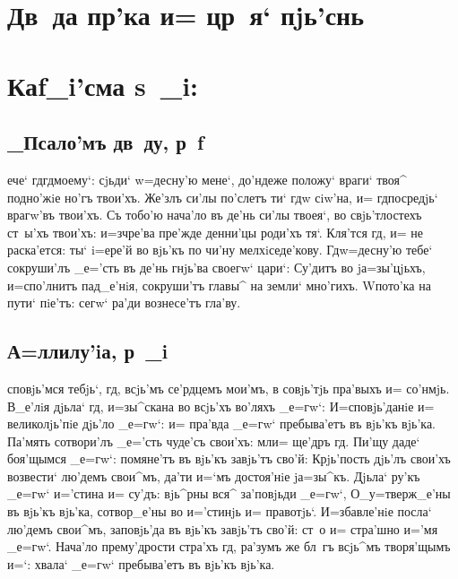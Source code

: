 \documentclass[12pt,a6paper,twoside,dvips,civil=antiqua,cs=pochaev]{hipbook}
\begin{document}
\csendpict

\clearpage
\hdrcrosspage

\section{{\Large Дв~да пр'ка и= цр~я` пjь'снь}}
\section[Каf_i'сма s~_i]{Каf_i'сма s~_i:}

\subsection{_Псало'мъ дв~ду, р~f}

ече` гд гд моему`: сjьди` w=десну'ю мене`, до'ндеже  по\-ло\-жу`
враги` твоя^ подно'жiе но'гъ твои'хъ. Же'злъ си'лы по'\-слетъ ти` гд w\т
сiw'на, и= гд посредjь` врагw'въ тво\-и'хъ. Съ тобо'ю нача'ло въ де'нь
си'лы твоея`, во свjь'тлостехъ ст~ы'хъ твои'хъ: и=з\ъ чре'ва пре'\-жде денни'цы
роди'хъ тя`. Кля'т\-ся гд, и= не раска'ется: ты` i=ере'й во вjь'къ по чи'ну
мел\-хi\-се\-де'\-ко\-ву. Гд w=десну'ю тебе` сокруши'лъ _е='сть въ де'нь гнjь'\-ва
своегw` цари`: Су'дитъ во jа=зы'цjьхъ, и=спо'лнитъ па\-д_е'\-нiя, сокруши'тъ
главы^ на земли` мно'гихъ. W\т пото'ка на пути` пiе'тъ: сегw` ра'ди вознесе'тъ
гла'ву.

\delimpict

\subsection{А=ллилу'iа, р~_i}

сповjь'мся тебjь`, гд, всjь'мъ се'рдцемъ мои'мъ, в совjь'тjь
пра'выхъ и= со'нмjь. В_е'лiя дjьла` гд, и=зы^скана во всjь'хъ во'ляхъ
_е=гw`: И=сповjь'данiе и= великолjь'пiе дjь'ло _е=гw`: и= пра'вда _е=гw`
пребыва'етъ въ вjь'къ вjь'ка. Па'мять сотвори'лъ _е='сть чуде'съ свои'хъ:
мл и= ще'дръ гд. Пи'щу даде` боя'щымся _е=гw`: помяне'тъ въ вjь'къ
завjь'тъ сво'й: Крjь'\-пость дjь'лъ свои'хъ возвести` лю'демъ сво\-и^мъ, да'ти
и=`мъ достоя'нiе jа=зы^къ. Дjьла` ру'къ _е=гw` и='стина и= су'дъ: вjь^рны вся^
за'\-по\-вjь\-ди _е=гw`, О_у=тверж_е'ны въ вjь'къ вjь'ка, сотвор_е'ны во
и='стинjь и= правотjь`. И=збавле'нiе посла` лю'демъ свои^мъ, заповjь'да въ
вjь'къ за\-вjь'тъ сво'й: ст~о и= стра'шно и='мя _е=гw`. На\-ча'\-ло
прему'дрости стра'хъ гд, ра'зумъ же бл~гъ всjь^мъ творя'щымъ и=`: хвала`
_е=гw` пребыва'етъ въ вjь'къ вjь'ка.
\end{document}
